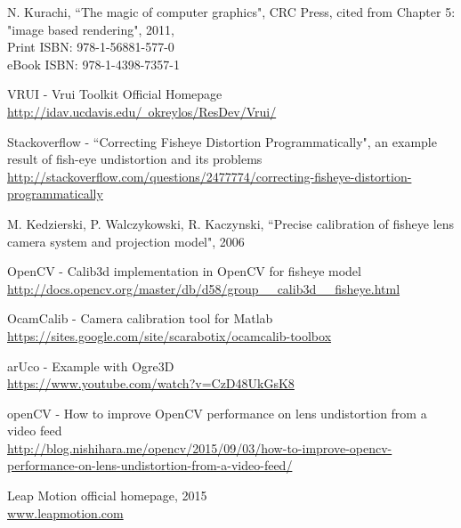 \begin{thebibliography}{99}
N. Kurachi, 
``The magic of computer graphics", CRC Press, cited from Chapter 5: "image based rendering", 2011,\\
Print ISBN: 978-1-56881-577-0\\
eBook ISBN: 978-1-4398-7357-1

VRUI - Vrui Toolkit Official Homepage \\ \href{http://idav.ucdavis.edu/~okreylos/ResDev/Vrui/}{http://idav.ucdavis.edu/~okreylos/ResDev/Vrui/}

Stackoverflow - ``Correcting Fisheye Distortion Programmatically", an example result of fish-eye undistortion and its problems \\ \href{http://stackoverflow.com/questions/2477774/correcting-fisheye-distortion-programmatically}{http://stackoverflow.com/questions/2477774/correcting-fisheye-distortion-programmatically}

M. Kedzierski, P. Walczykowski, R. Kaczynski,
``Precise calibration of fisheye lens camera system and projection model", 2006

OpenCV - Calib3d implementation in OpenCV for fisheye model \\ \href{http://docs.opencv.org/master/db/d58/group_\_calib3d_\_fisheye.html}{http://docs.opencv.org/master/db/d58/group\_\_calib3d\_\_fisheye.html}


OcamCalib - Camera calibration tool for Matlab \\ \href{https://sites.google.com/site/scarabotix/ocamcalib-toolbox}{https://sites.google.com/site/scarabotix/ocamcalib-toolbox}

arUco - Example with Ogre3D \\ \href{https://www.youtube.com/watch?v=CzD48UkGsK8}{https://www.youtube.com/watch?v=CzD48UkGsK8}

openCV - How to improve OpenCV performance on lens undistortion from a video feed \\ \href{http://blog.nishihara.me/opencv/2015/09/03/how-to-improve-opencv-performance-on-lens-undistortion-from-a-video-feed/}{http://blog.nishihara.me/opencv/2015/09/03/how-to-improve-opencv-performance-on-lens-undistortion-from-a-video-feed/}

Leap Motion official homepage, 2015 \\ \href{https://www.leapmotion.com/}{www.leapmotion.com}

\iffalse
\fi


\end{thebibliography}
